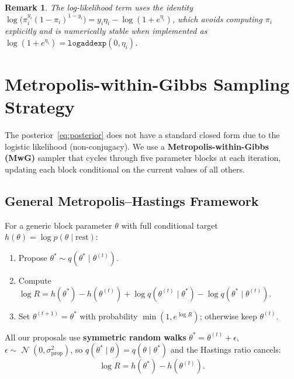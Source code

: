 \documentclass[11pt]{article}
\newtheorem{remark}{Remark}
\DeclareMathOperator{\Normal}{\mathcal{N}}
\begin{document}
\begin{remark}
The log-likelihood term uses the identity
$\log\bigl(\pi_i^{y_i}(1-\pi_i)^{1-y_i}\bigr) = y_i\eta_i - \log(1+e^{\eta_i})$,
which avoids computing $\pi_i$ explicitly and is numerically stable
when implemented as $\log(1+e^{\eta_i}) = \texttt{logaddexp}(0,\eta_i)$.
\end{remark}

\section{Metropolis-within-Gibbs Sampling Strategy}
\label{sec:mwg}

The posterior~\eqref{eq:posterior} does not have a standard closed form
due to the logistic likelihood (non-conjugacy). We use a
\textbf{Metropolis-within-Gibbs (MwG)} sampler that cycles through five
parameter blocks at each iteration, updating each block conditional on
the current values of all others.

\subsection{General Metropolis--Hastings Framework}

For a generic block parameter $\theta$ with full conditional target
$h(\theta) = \log p(\theta \mid \text{rest})$:

\begin{enumerate}
  \item Propose $\theta^* \sim q(\theta^* \mid \theta^{(t)})$.
  \item Compute $\log R = h(\theta^*) - h(\theta^{(t)}) + \log q(\theta^{(t)} \mid \theta^*) - \log q(\theta^* \mid \theta^{(t)})$.
  \item Set $\theta^{(t+1)} = \theta^*$ with probability $\min(1, e^{\log R})$; otherwise keep $\theta^{(t)}$.
\end{enumerate}

All our proposals use \textbf{symmetric random walks}
$\theta^* = \theta^{(t)} + \epsilon$, $\epsilon \sim \Normal(0, \sigma_{\text{prop}}^2)$,
so $q(\theta^* \mid \theta) = q(\theta \mid \theta^*)$ and the Hastings
ratio cancels:
\begin{equation}\label{eq:metropolis-ratio}
  \log R = h(\theta^*) - h(\theta^{(t)}).
\end{equation}
\end{document}
